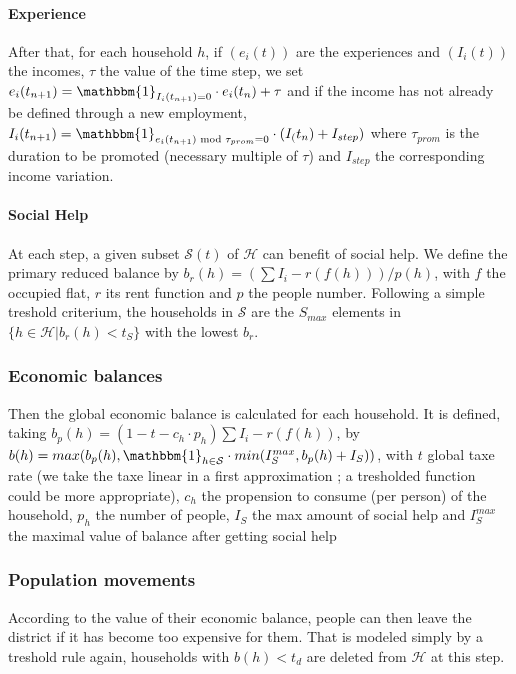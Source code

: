 \documentclass[english]{article}
\begin{document}
\paragraph{Experience}

After that, for each household $h$, if $(e_{i}(t))$ are the experiences
and $(I_{i}(t))$ the incomes, $\tau$ the value of the time step,
we set $e_{i}(t_{n+1})= \mathbbm{1}_{I_{i}(t_{n+1})=0}\cdot e_{i}(t_{n})+ \tau$
and if the income has not already be defined through a new employment,
$I_{i}(t_{n+1}) = \mathbbm{1}_{e_{i}(t_{n+1}) \textrm{ mod } \tau_{prom} = 0}\cdot (I_(t_{n})+I_{step})$
where $\tau_{prom}$ is the duration to be promoted (necessary multiple
of $\tau$) and $I_{step}$ the corresponding income variation.


\paragraph{Social Help}

At each step, a given subset $\mathcal{S}(t)$ of $\mathcal{H}$ can
benefit of social help. We define the primary reduced balance by $b_{r}(h)=(\sum I_{i}-r(f(h)))/p(h)$,
with $f$ the occupied flat, $r$ its rent function and $p$ the people
number. Following a simple treshold criterium, the households in $\mathcal{S}$
are the $S_{max}$ elements in $\{h\in\mathcal{H}|b_{r}(h)<t_{S}\}$
with the lowest $b_{r}$.


\subsubsection{Economic balances}

Then the global economic balance is calculated for each household.
It is defined, taking $b_{p}(h)=(1-t-c_{h}\cdot p_{h})\sum I_{i}-r(f(h))$,
by $b(h)=max(b_{p}(h),\mathbbm{1}_{h\in \mathcal{S}} \cdot min(I_{S}^{max},b_{p}(h)+I_{S}))$,
with $t$ global taxe rate (we take the taxe linear in a first approximation
; a tresholded function could be more appropriate), $c_{h}$ the propension
to consume (per person) of the household, $p_{h}$ the number of people,
$I_{S}$ the max amount of social help and $I_{S}^{max}$ the maximal
value of balance after getting social help


\subsubsection{Population movements}

According to the value of their economic balance, people can then
leave the district if it has become too expensive for them. That is
modeled simply by a treshold rule again, households with $b(h)<t_{d}$
are deleted from $\mathcal{H}$ at this step.
\end{document}
